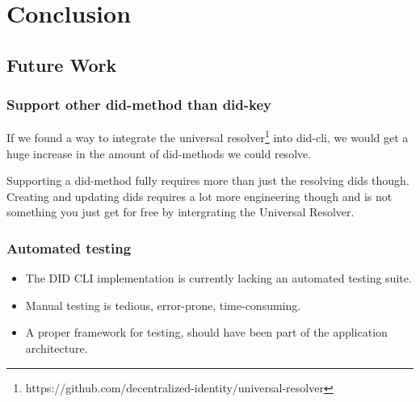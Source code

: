 \chapter{Conclusion}




\section{Future Work}

\subsection{Support other \gls{did-method} than \gls{did-key}}

If we found a way to integrate the universal resolver\footnote{https://github.com/decentralized-identity/universal-resolver} into \gls{did-cli}, we would get a huge increase in the amount of \glspl{did-method} we could resolve.

Supporting a \gls{did-method} fully requires more than just the resolving \acrshort{dids} though. Creating and updating \acrshort{dids} requires a lot more engineering though and is not something you just get for free by intergrating the Universal Resolver.

\subsection{Automated testing}

\begin{itemize}
    \item The DID CLI implementation is currently lacking an automated testing suite.
    \item Manual testing is tedious, error-prone, time-consuming.
    \item A proper framework for testing, should have been part of the application architecture.
\end{itemize}

